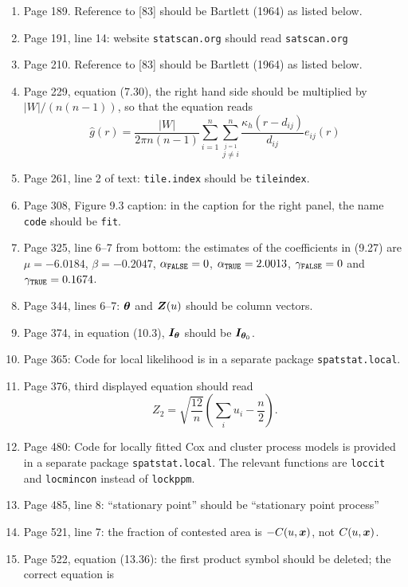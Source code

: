 \documentclass[12pt,a4paper]{article}
\newcommand{\boldmaths}[1]{{\ensuremath\boldsymbol{#1}}}
\newcommand{\bx}{\boldmaths x}
\newcommand{\bZ}{\boldmaths Z}
\newcommand{\btheta}{\boldmaths\theta}
\newcommand{\suminej}{\sum_{i=1}^n \sum_{\stackrel{j=1}{\!\!j \neq i}}^n}
\begin{document}
\begin{enumerate}
\item Page 189. Reference to [83] should be Bartlett (1964)
  as listed below.
\item Page 191, line 14: 
 website \texttt{statscan.org} should read \texttt{satscan.org}
\item Page 210. Reference to [83] should be Bartlett (1964)
  as listed below.
\item Page 229, equation (7.30), the right hand side should
  be multiplied by $|W|/(n(n-1))$, so that the equation reads
  \[
  \widehat g(r) = \frac {|W|}{2\pi n(n-1)}
  \suminej \frac{
    \kappa_h(r - d_{ij})
  }{
    d_{ij}
  } e_{ij}(r)
  \]
\item Page 261, line 2 of text: 
\texttt{tile.index} should be \texttt{tileindex}.
\item Page 308, Figure 9.3 caption: in the caption for the right panel,
the name \texttt{code} should be \texttt{fit}.
\item Page 325, line 6--7 from bottom: the estimates of the coefficients
  in (9.27) are $\mu =-6.0184$, $\beta=-0.2047$,
  $\alpha_{\mbox{\scriptsize \texttt{FALSE}}} = 0$,
  $\alpha_{\mbox{\scriptsize \texttt{TRUE}}} = 2.0013$,
  $\gamma_{\mbox{\scriptsize \texttt{FALSE}}} = 0$ and
  $\gamma_{\mbox{\scriptsize \texttt{TRUE}}} = 0.1674$.
\item Page 344, lines 6--7: $\btheta$ and $\bZ(u)$ 
should be column vectors.
\item Page 374, in equation (10.3), ${\boldmaths I}_\btheta$
  should be ${\boldmaths I}_{\btheta_0}$.
\item Page 365: Code for local likelihood is in a separate package
  \texttt{spatstat.local}.
\item Page 376, third displayed equation should read
  \[
       Z_2 = \sqrt{\frac{12}{n}} \left(\sum_i u_i - \frac n 2\right).
  \]
\item Page 480: Code for locally fitted Cox and cluster process models
  is provided in a separate package \texttt{spatstat.local}.
  The relevant functions are \texttt{loccit} and \texttt{locmincon}
  instead of \texttt{lockppm}.
\item Page 485, line 8: ``stationary point'' should be
  ``stationary point process''
\item Page 521, line 7: the fraction of contested area is $-C(u, \bx)$,
not $C(u,\bx)$.
\item Page 522, equation (13.36): the first product symbol should be deleted;
  the correct equation is
  \begin{large}

\end{large}
\end{enumerate}
\end{document}
